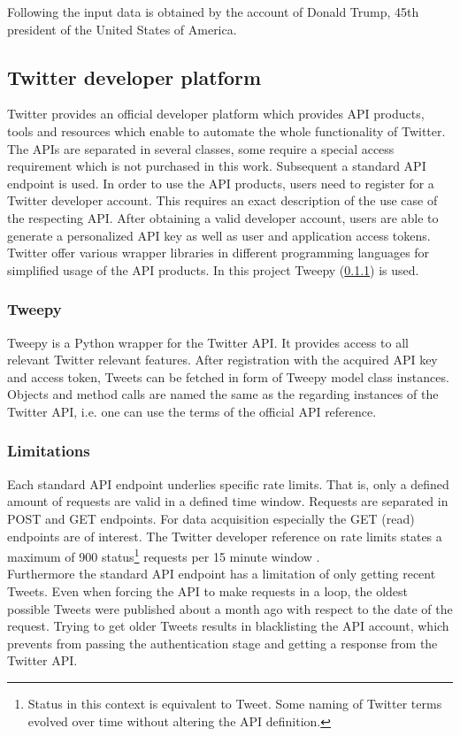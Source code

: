 \documentclass[hidelinks, conference]{IEEEtran}
\begin{document}
Following the input data is obtained by the account of Donald Trump, 45th president of the United States of America.

\subsection{Twitter developer platform}\label{subsec_twitter}

Twitter provides an official developer platform which provides API products, tools and resources which enable to automate the whole functionality of Twitter. The APIs are separated in several classes, some require a special access requirement which is not purchased in this work. Subsequent a standard API endpoint is used. In order to use the API products, users need to register for a Twitter developer account. This requires an exact description of the use case of the respecting API. After obtaining a valid developer account, users are able to generate a personalized API key as well as user and application access tokens. Twitter offer various wrapper libraries in different programming languages for simplified usage of the API products. In this project Tweepy (\ref{subsubsec_tweepy}) is used. \cite{tweepy}

\subsubsection{Tweepy}\label{subsubsec_tweepy}

Tweepy is a Python wrapper for the Twitter API. It provides access to all relevant Twitter relevant features. After registration with the acquired API key and access token, Tweets can be fetched in form of Tweepy model class instances. Objects and method calls are named the same as the regarding instances of the Twitter API, i.e. one can use the terms of the official API reference.

\subsubsection{Limitations}

Each standard API endpoint underlies specific rate limits. That is, only a defined amount of requests are valid in a defined time window. Requests are separated in POST and GET endpoints. For data acquisition especially the GET (read) endpoints are of interest. The Twitter developer reference on rate limits states a maximum of 900 status\footnote{Status in this context is equivalent to Tweet. Some naming of Twitter terms evolved over time without altering the API definition.} requests per 15 minute window \cite{twidev_rates}.\\
Furthermore the standard API endpoint has a limitation of only getting recent Tweets. Even when forcing the API to make requests in a loop, the oldest possible Tweets were published about a month ago with respect to the date of the request. Trying to get older Tweets results in blacklisting the API account, which prevents from passing the authentication stage and getting a response from the Twitter API. 
\end{document}
